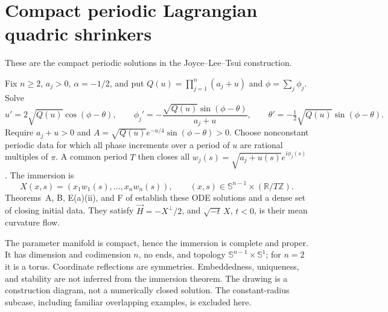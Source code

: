 \chapter{Compact periodic Lagrangian quadric shrinkers}\label{sec:catalogue-jlt-compact-shrinkers}
These are the compact periodic solutions in the Joyce--Lee--Tsui construction.
\begin{example}\label{ex:catalogue-jlt-compact-shrinkers}
Fix $n\geq2$, $a_j>0$, $\alpha=-1/2$, and put $Q(u)=\prod_{j=1}^n(a_j+u)$ and $\phi=\sum_j\phi_j$. Solve
\[
 u'=2\sqrt{Q(u)}\cos(\phi-\theta),\qquad
 \phi_j'=-\frac{\sqrt{Q(u)}\sin(\phi-\theta)}{a_j+u},\qquad
 \theta'=-\tfrac12\sqrt{Q(u)}\sin(\phi-\theta).
\]
Require $a_j+u>0$ and $A=\sqrt{Q(u)}e^{-u/4}\sin(\phi-\theta)>0$.
Choose nonconstant periodic data for which all phase increments over a period of $u$ are rational multiples of $\pi$. A common period $T$ then closes all $w_j(s)=\sqrt{a_j+u(s)}e^{i\phi_j(s)}$. The immersion is
\[
 X(x,s)=(x_1w_1(s),\ldots,x_nw_n(s)),\qquad
 (x,s)\in\mathbb S^{n-1}\times(\mathbb R/T\mathbb Z).
\]
Theorems~A, B, E(a)(ii), and F of \cite{CatJoyceLeeTsui2010} establish these ODE solutions and a dense set of closing initial data. They satisfy $\vec H=-X^\perp/2$, and $\sqrt{-t}\,X$, $t<0$, is their mean curvature flow.

The parameter manifold is compact, hence the immersion is complete and proper. It has dimension and codimension $n$, no ends, and topology $\mathbb S^{n-1}\times\mathbb S^1$; for $n=2$ it is a torus. Coordinate reflections are symmetries. Embeddedness, uniqueness, and stability are not inferred from the immersion theorem. The drawing is a construction diagram, not a numerically closed solution. The constant-radius subcase, including familiar overlapping examples, is excluded here.
\end{example}

